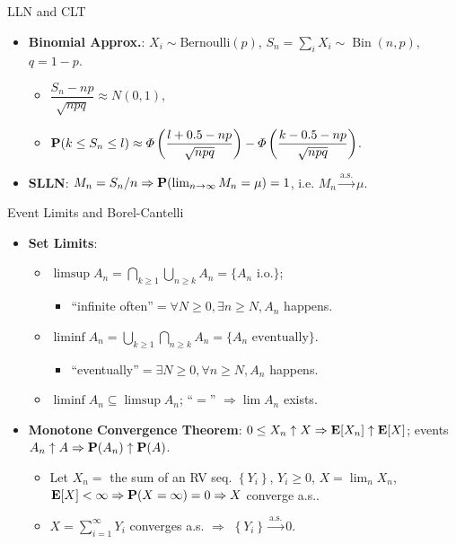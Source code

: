 \documentclass[landscape,a4paper]{article}
\begin{document}
\begin{cheatsheetcolumns}
\begin{card}{LLN and CLT}
\begin{itemize}
				\item \textbf{Binomial Approx.}: $X_i\sim\text{Bernoulli}(p)$, $S_n=\sum_iX_i\sim\operatorname{Bin}(n,p)$,\\ $q=1-p$.
				\begin{itemize}
					\item $\dfrac{S_n-np}{\sqrt{npq}}\approx N(0,1)$,
					\item $\mathbf{P}(k\le S_n\le l)\approx\varPhi\left(\dfrac{l+0.5-np}{\sqrt{npq}}\right)-\varPhi\left(\dfrac{k-0.5-np}{\sqrt{npq}}\right)$.
				\end{itemize}
				\item \textbf{SLLN}: $M_n=S_n/n\Rightarrow \mathbf{P}(\lim_{n\to\infty}M_n=\mu)=1$, i.e. $M_n\xrightarrow{\mathrm{a.s.}}\mu$.
			\end{itemize}
		\end{card}
		\begin{card}{Event Limits and Borel-Cantelli}
			\begin{itemize}
				\item \textbf{Set Limits}:
				\begin{itemize}
					\item $\limsup A_n=\bigcap_{k\ge1}\bigcup_{n\ge k}A_n=\{A_n\text{ i.o.}\}$;
					\begin{itemize}
						\item ``infinite often''$=\forall N\ge 0, \exists n \ge N, A_n$ happens.
					\end{itemize}
					\item $\liminf A_n=\bigcup_{k\ge1}\bigcap_{n\ge k}A_n=\{A_n\text{ eventually}\}$.
					\begin{itemize}
						\item ``eventually''$=\exists N\ge 0, \forall n \ge N, A_n$ happens.
					\end{itemize}
					\item $\liminf A_n\subseteq\limsup A_n$; ``$=$'' $\Rightarrow\lim A_n$ exists. 
				\end{itemize}
				\item \textbf{Monotone Convergence Theorem}: $0\le X_n\uparrow X\Rightarrow\mathbf{E}[X_n]\uparrow\mathbf{E}[X]$; events $A_n\uparrow A\Rightarrow\mathbf{P}(A_n)\uparrow\mathbf{P}(A)$.
				\begin{itemize}
					\item Let $X_n=$ the sum of an RV seq. $\left\{Y_i\right\}$, $Y_i\ge 0$, $X=\lim_n X_n$,\\$\mathbf{E}[X]<\infty\Rightarrow\mathbf P(X=\infty)=0\Rightarrow X$ converge a.s..
					\item $X=\sum_{i=1}^\infty Y_i$ converges a.s. $\Rightarrow$ $\left\{Y_i\right\}\xrightarrow{\mathrm{a.s.}}0$.

\end{itemize}
\end{itemize}
\end{card}
\end{cheatsheetcolumns}
\end{document}
